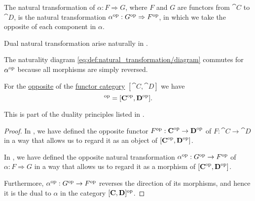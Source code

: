 \begin{definition}\label{def:opposite_natural_transformation}\mimprovised
  The  natural transformation of \( \alpha: F \Rightarrow G \), where \( F \) and \( G \) are functors from \( \cat{C} \) to \( \cat{D} \), is the natural transformation \( \alpha^{\operatorname{op}}: G^{\operatorname{op}} \Rightarrow F^{\operatorname{op}} \), in which we take the opposite of each component in \( \alpha \).

  Dual natural transformation arise naturally in .
\end{definition}
\begin{defproof}
  The naturality diagram \eqref{eq:def:natural_transformation/diagram} commutes for \( \alpha^{\operatorname{op}} \) because all morphisms are simply reversed.
\end{defproof}

\begin{proposition}\label{thm:opposite_of_functor_category}
  For the \hyperref[def:opposite_category]{opposite} of the \hyperref[def:functor_category]{functor category} \( [\cat{C}, \cat{D}] \) we have
  \begin{equation*}
    [\cat{C}, \cat{D}]^{\opcat} = [\cat{C}^{\opcat}, \cat{D}^{\opcat}].
  \end{equation*}

  This is part of the duality principles listed in .
\end{proposition}
\begin{proof}
  In , we have defined the opposite functor \( F^{\operatorname{op}}: \operatorname{\mathbf{C}}^{\operatorname{op}} \to \operatorname{\mathbf{D}}^{\operatorname{op}} \) of \( F: \cat{C} \to \cat{D} \) in a way that allows us to regard it as an object of \( [\operatorname{\mathbf{C}}^{\operatorname{op}}, \operatorname{\mathbf{D}}^{\operatorname{op}}] \).

  In , we have defined the opposite natural transformation \( \alpha^{\operatorname{op}}: G^{\operatorname{op}} \to F^{\operatorname{op}} \) of \( \alpha: F \Rightarrow G \) in a way that allows us to regard it as a morphism of \( [\operatorname{\mathbf{C}}^{\operatorname{op}}, \operatorname{\mathbf{D}}^{\operatorname{op}}] \).

  Furthermore, \( \alpha^{\operatorname{op}}: G^{\operatorname{op}} \to F^{\operatorname{op}} \) reverses the direction of its morphisms, and hence it is the dual to \( \alpha \) in the category \( [\operatorname{\mathbf{C}}, \operatorname{\mathbf{D}}]^{\operatorname{op}} \).
\end{proof}

